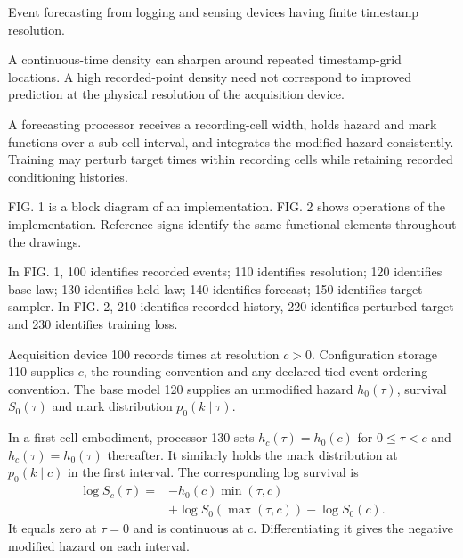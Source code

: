 \documentclass[pct]{sm-patent}
\begin{document}
\descriptionstart


\pnum Event forecasting from logging and sensing devices having finite timestamp resolution.


\pnum A continuous-time density can sharpen around repeated timestamp-grid locations. A high recorded-point density need not correspond to improved prediction at the physical resolution of the acquisition device.


\pnum A forecasting processor receives a recording-cell width, holds hazard and mark functions over a sub-cell interval, and integrates the modified hazard consistently. Training may perturb target times within recording cells while retaining recorded conditioning histories.


\pnum FIG. 1 is a block diagram of an implementation. FIG. 2 shows operations of the implementation. Reference signs identify the same functional elements throughout the drawings.


\pnum In FIG. 1, 100 identifies recorded events; 110 identifies resolution; 120 identifies base law; 130 identifies held law; 140 identifies forecast; 150 identifies target sampler. In FIG. 2, 210 identifies recorded history, 220 identifies perturbed target and 230 identifies training loss.

\pnum Acquisition device 100 records times at resolution $c>0$. Configuration storage 110 supplies $c$, the rounding convention and any declared tied-event ordering convention. The base model 120 supplies an unmodified hazard $h_0(\tau)$, survival $S_0(\tau)$ and mark distribution $p_0(k\mid\tau)$.

\pnum In a first-cell embodiment, processor 130 sets $h_c(\tau)=h_0(c)$ for $0\leq\tau<c$ and $h_c(\tau)=h_0(\tau)$ thereafter. It similarly holds the mark distribution at $p_0(k\mid c)$ in the first interval. The corresponding log survival is
\[\begin{aligned}\log S_c(\tau)={}&-h_0(c)\min(\tau,c)\\ &+\log S_0(\max(\tau,c))-\log S_0(c).\end{aligned}
\]
It equals zero at $\tau=0$ and is continuous at $c$. Differentiating it gives the negative modified hazard on each interval.
\end{document}
